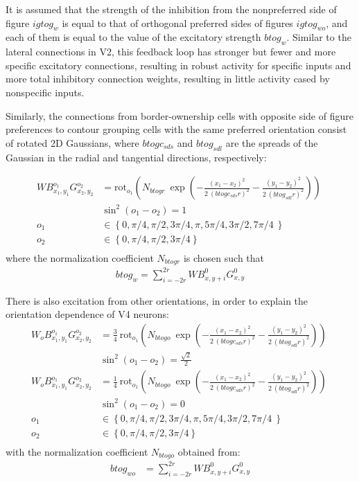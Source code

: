 It is assumed that the strength of the inhibition from the nonpreferred
side of figure $igtog_w$ is equal to that of orthogonal preferred sides
of figures $igtog_{wo}$, and each of them is equal to the value of the
excitatory strength $btog_w$. Similar to the lateral connections in
V2, this feedback loop has stronger but fewer and more specific
excitatory connections, resulting in robust activity for specific
inputs and more total inhibitory connection weights, resulting in
little activity cased by nonspecific inputs. 

Similarly, the connections from border-ownership cells with opposite side of figure preferences to contour grouping cells with the same preferred orientation consist of rotated 2D Gaussians,
where $btogc_{sds}$ and $btog_{sdl}$ are the spreads of the Gaussian in the radial and tangential directions, respectively:

\begin{align}
	WB^{o_1}_{x_1,y_1}G^{o_2}_{x_2,y_2}&=\text{rot}_{o_1}\left(N_{btogr}\: \exp\left(-\frac{(x_1-x_2)^2}{2\: (btogc_{sds} r)^2}
	-\frac{(y_1-y_2)^2}{2\: (btog_{sdl} r)^2}\right)\right)\  \nonumber\\ 
	 &\sin^2(o_1-o_2) = 1 \nonumber\\
	 o_1&\in \left\{0,\pi/4,\pi/2,3\pi/4,\pi,5\pi/4,3\pi/2,7\pi/4\ \right\} \nonumber\\
	 o_2&\in \left\{0,\pi/4,\pi/2,3\pi/4 \right\} \nonumber\\
\end{align}
where the normalization coefficient $N_{btogr}$ is chosen such that
\begin{align}
	btog_w=\sum^{2r}_{i=-2r} WB^{0}_{x,y+i}G^{0}_{x,y}
\end{align}

There is also excitation from other orientations, in order to explain the orientation dependence
of V4 neurons:
\begin{align}
	W_{o}B^{o_1}_{x_1,y_1}G^{o_2}_{x_2,y_2}&=\frac{3}{4}\: \text{rot}_{o_1}\left(N_{btogo}\: \exp\left(-\frac{(x_1-x_2)^2}{2\: (btogc_{sds} r)^2}
        -\frac{(y_1-y_2)^2}{2\: (btog_{sdl} r)^2}\right)\right)\ \nonumber\\
        	 &\sin^2(o_1-o_2) = \frac{\sqrt{2}}{2} \nonumber\\
    W_{o}B^{o_1}_{x_1,y_1}G^{o_2}_{x_2,y_2}&=\frac{1}{4}\: \text{rot}_{o_1}\left(N_{btogo}\: \exp\left(-\frac{(x_1-x_2)^2}{2\: (btogc_{sds} r)^2}
        -\frac{(y_1-y_2)^2}{2\: (btog_{sdl} r)^2}\right)\right)\ \nonumber\\
        	 &\sin^2(o_1-o_2) = 0 \nonumber\\
	 o_1&\in \left\{0,\pi/4,\pi/2,3\pi/4,\pi,5\pi/4,3\pi/2,7\pi/4\ \right\} \nonumber\\
	 o_2&\in \left\{0,\pi/4,\pi/2,3\pi/4 \right\} \nonumber\\
\end{align}
with the normalization coefficient $N_{btogo}$ obtained from:
\begin{align}
	btog_{wo}&=\sum^{2r}_{i=-2r} WB^{0}_{x,y+i}G^{0}_{x,y} 	
\end{align}

